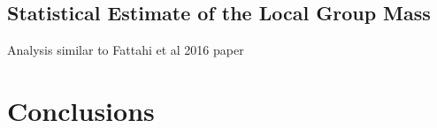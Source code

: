 \documentclass[english, oneside]{HYgradu}
\begin{document}
\section{Statistical Estimate of the Local Group Mass}
Analysis similar to Fattahi et al 2016 paper

%
%

\chapter{Conclusions}






\clearpage
{} %


\end{document}
